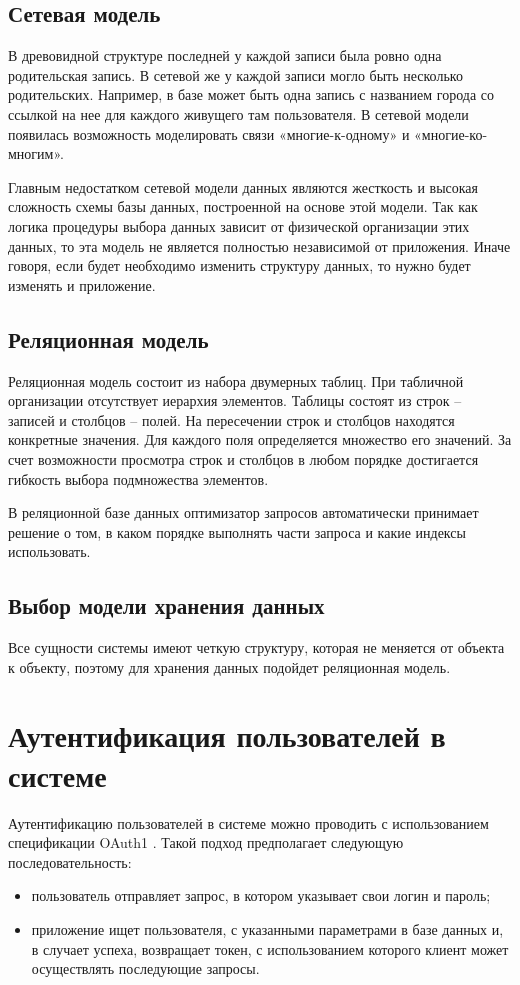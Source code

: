 \subsection{Сетевая модель}
В древовидной структуре последней у каждой записи была ровно одна родительская запись. В сетевой же у каждой записи могло быть несколько родительских. Например, в базе
может быть одна запись с названием города со ссылкой на нее
для каждого живущего там пользователя. В сетевой модели появилась возможность моделировать связи «многие-к-одному» и «многие-ко-многим».

Главным недостатком сетевой модели данных являются жесткость и высокая сложность схемы базы данных, построенной на основе этой модели. Так как логика процедуры выбора данных зависит от физической организации этих данных, то эта модель не является полностью независимой от приложения. Иначе говоря, если будет необходимо изменить структуру данных, то нужно будет изменять и приложение.

\subsection{Реляционная модель}
Реляционная модель состоит из набора двумерных таблиц. При табличной организации отсутствует иерархия элементов. Таблицы состоят из строк – записей и столбцов – полей. На пересечении строк и столбцов находятся конкретные значения. Для каждого поля определяется множество его значений. За счет возможности просмотра строк и столбцов в любом порядке достигается гибкость выбора подмножества элементов.

В реляционной базе данных оптимизатор запросов автоматически принимает решение о том, в каком порядке выполнять части запроса и какие индексы использовать.

\subsection{Выбор модели хранения данных}
Все сущности системы имеют четкую структуру, которая не меняется от объекта к объекту, поэтому для хранения данных подойдет реляционная модель.

\section{Аутентификация пользователей в системе}

Аутентификацию пользователей в системе можно проводить с использованием спецификации OAuth1 \cite{oauth1}. Такой подход предполагает следующую последовательность:
\begin{itemize}
	\item пользователь отправляет запрос, в котором указывает свои логин и пароль;
	\item приложение ищет пользователя, с указанными параметрами в базе данных и, в случает успеха, возвращает токен, с использованием которого клиент может осуществлять последующие запросы.
\end{itemize}


